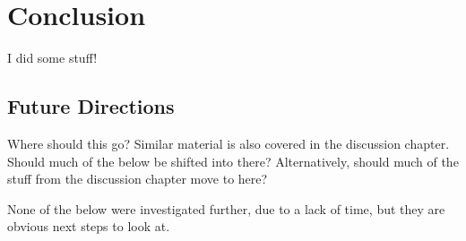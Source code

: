 \chapter{Conclusion}

I did some stuff!

\section{Future Directions}

\begin{anfxwarning}{Where should this go?}
    Similar material is also covered in the discussion chapter.  Should much of the below be shifted into there?  Alternatively, should much of the stuff from the discussion chapter move to here?
\end{anfxwarning}








None of the below were investigated further, due to a lack of time, but they are obvious next steps to look at.


